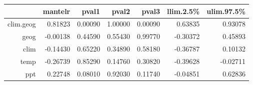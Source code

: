 \begin{table}[ht]
\centering
\begin{tabular}{rrrrrrr}
  \hline
 & mantelr & pval1 & pval2 & pval3 & llim.2.5\% & ulim.97.5\% \\ 
  \hline
clim.geog & 0.81823 & 0.00090 & 1.00000 & 0.00090 & 0.63835 & 0.93078 \\ 
  geog & -0.00138 & 0.44590 & 0.55430 & 0.99770 & -0.30372 & 0.45893 \\ 
  clim & -0.14430 & 0.65220 & 0.34890 & 0.58180 & -0.36787 & 0.10132 \\ 
  temp & -0.26739 & 0.85290 & 0.14760 & 0.30820 & -0.39628 & -0.02711 \\ 
  ppt & 0.22748 & 0.08010 & 0.92030 & 0.11740 & -0.04851 & 0.62836 \\ 
   \hline
\end{tabular}
\end{table}
